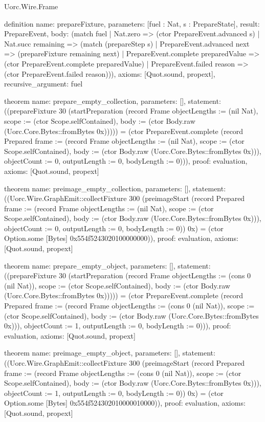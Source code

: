 \begin{lexlean}{Uorc.Wire.Frame}
\begin{semanticmodule}
definition{
  name: prepareFixture,
  parameters: [fuel : Nat, s : PrepareState],
  result: PrepareEvent,
  body: (match fuel
    | Nat.zero => (ctor PrepareEvent.advanced s)
    | Nat.succ remaining => (match (prepareStep s)
      | PrepareEvent.advanced next => (prepareFixture remaining next)
      | PrepareEvent.complete preparedValue => (ctor PrepareEvent.complete preparedValue)
      | PrepareEvent.failed reason => (ctor PrepareEvent.failed reason))),
  axioms: [Quot.sound, propext],
  recursive_argument: fuel
}

theorem{
  name: prepare_empty_collection,
  parameters: [],
  statement: ((prepareFixture 30 (startPreparation (record Frame {objectLengths := (nil Nat), scope := (ctor Scope.selfContained), body := (ctor Body.raw (Uorc.Core.Bytes::fromBytes 0x))}))) = (ctor PrepareEvent.complete (record Prepared {frame := (record Frame {objectLengths := (nil Nat), scope := (ctor Scope.selfContained), body := (ctor Body.raw (Uorc.Core.Bytes::fromBytes 0x))}), objectCount := 0, outputLength := 0, bodyLength := 0}))),
  proof: evaluation{},
  axioms: [Quot.sound, propext]
}

theorem{
  name: preimage_empty_collection,
  parameters: [],
  statement: ((Uorc.Wire.GraphEmit::collectFixture 300 (preimageStart (record Prepared {frame := (record Frame {objectLengths := (nil Nat), scope := (ctor Scope.selfContained), body := (ctor Body.raw (Uorc.Core.Bytes::fromBytes 0x))}), objectCount := 0, outputLength := 0, bodyLength := 0})) 0x) = (ctor Option.some [Bytes] 0x554f5243020100000000)),
  proof: evaluation{},
  axioms: [Quot.sound, propext]
}

theorem{
  name: prepare_empty_object,
  parameters: [],
  statement: ((prepareFixture 30 (startPreparation (record Frame {objectLengths := (cons 0 (nil Nat)), scope := (ctor Scope.selfContained), body := (ctor Body.raw (Uorc.Core.Bytes::fromBytes 0x))}))) = (ctor PrepareEvent.complete (record Prepared {frame := (record Frame {objectLengths := (cons 0 (nil Nat)), scope := (ctor Scope.selfContained), body := (ctor Body.raw (Uorc.Core.Bytes::fromBytes 0x))}), objectCount := 1, outputLength := 0, bodyLength := 0}))),
  proof: evaluation{},
  axioms: [Quot.sound, propext]
}

theorem{
  name: preimage_empty_object,
  parameters: [],
  statement: ((Uorc.Wire.GraphEmit::collectFixture 300 (preimageStart (record Prepared {frame := (record Frame {objectLengths := (cons 0 (nil Nat)), scope := (ctor Scope.selfContained), body := (ctor Body.raw (Uorc.Core.Bytes::fromBytes 0x))}), objectCount := 1, outputLength := 0, bodyLength := 0})) 0x) = (ctor Option.some [Bytes] 0x554f524302010000010000)),
  proof: evaluation{},
  axioms: [Quot.sound, propext]
}


\end{semanticmodule}
\end{lexlean}
